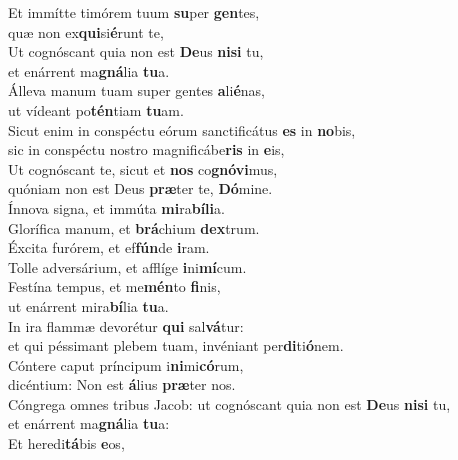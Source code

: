 \evenverse Et immítte timórem tuum \textbf{su}per \textbf{gen}tes,~\*\\
\evenverse quæ non ex\textbf{qui}si\textbf{é}runt te,\\
\oddverse Ut cognóscant quia non est \textbf{De}us \textbf{ni}\textbf{si} tu,~\*\\
\oddverse et enárrent ma\textbf{gná}lia \textbf{tu}a.\\
\evenverse Álleva manum tuam super gentes \textbf{a}li\textbf{é}nas,~\*\\
\evenverse ut vídeant po\textbf{tén}tiam \textbf{tu}am.\\
\oddverse Sicut enim in conspéctu eórum sanctificátus \textbf{es} in \textbf{no}bis,~\*\\
\oddverse sic in conspéctu nostro magnificábe\textbf{ris} in \textbf{e}is,\\
\evenverse Ut cognóscant te, sicut et \textbf{nos} co\textbf{gnó}\textbf{vi}mus,~\*\\
\evenverse quóniam non est Deus \textbf{præ}ter te, \textbf{Dó}mine.\\
\oddverse Ínnova signa, et immúta \textbf{mi}ra\textbf{bí}\textbf{li}a.~\*\\
\oddverse Glorífica manum, et \textbf{brá}chium \textbf{dex}trum.\\
\evenverse Éxcita furórem, et ef\textbf{fún}de \textbf{i}ram.~\*\\
\evenverse Tolle adversárium, et afflíge \textbf{i}ni\textbf{mí}cum.\\
\oddverse Festína tempus, et me\textbf{mén}to \textbf{fi}nis,~\*\\
\oddverse ut enárrent mira\textbf{bí}lia \textbf{tu}a.\\
\evenverse In ira flammæ devorétur \textbf{qui} sal\textbf{vá}tur:~\*\\
\evenverse et qui péssimant plebem tuam, invéniant per\textbf{di}ti\textbf{ó}nem.\\
\oddverse Cóntere caput príncipum i\textbf{ni}mi\textbf{có}rum,~\*\\
\oddverse dicéntium: Non est \textbf{á}lius \textbf{præ}ter nos.\\
\evenverse Cóngrega omnes tribus Jacob: ut cognóscant quia non est \textbf{De}us \textbf{ni}\textbf{si} tu,~\*\\
\evenverse et enárrent ma\textbf{gná}lia \textbf{tu}a:\\
\oddverse Et heredi\textbf{tá}bis \textbf{e}os,~\*\\
